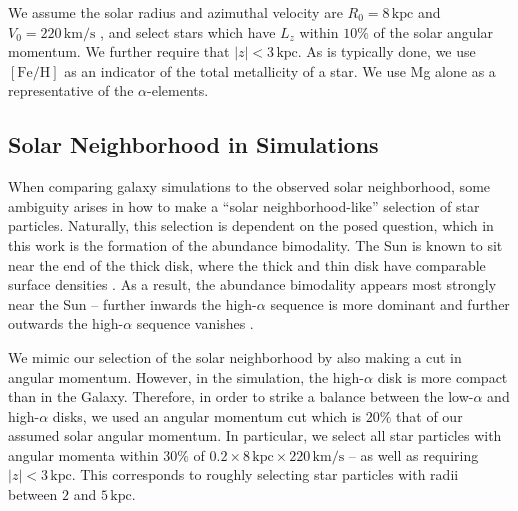 \documentclass[twocolumn,linenumbers,trackchanges]{aastex631}
\newcommand{\kpc}{\ensuremath{\textrm{kpc}}}
\newcommand{\kms}{\ensuremath{\textrm{km}/\textrm{s}}}
\newcommand{\FeH}{\ensuremath{[\textrm{Fe}/\textrm{H}]}}
\begin{document}
 We assume the solar radius and azimuthal velocity are $R_0=8\,\kpc$ and $V_0=220\,\kms$ \citep{2016ARA&A..54..529B}, and select stars which have $L_z$ within $10\%$ of the solar angular momentum. We further require that $\left|z\right| < 3\,\kpc$. As is typically done, we use \FeH{} as an indicator of the total metallicity of a star. We use Mg alone as a representative of the $\alpha$-elements.


\subsection{Solar Neighborhood in Simulations}\label{ssec:solarneigh}
When comparing galaxy simulations to the observed solar neighborhood, some ambiguity arises in how to make a ``solar neighborhood-like'' selection of star particles. Naturally, this selection is dependent on the posed question, which in this work is the formation of the abundance bimodality. The Sun is known to sit near the end of the thick disk, where the thick and thin disk have comparable surface densities \citep[the ratio of thick-to-thin is $\sim12\%$][]{2016ARA&A..54..529B}. As a result, the abundance bimodality appears most strongly near the Sun -- further inwards the high-$\alpha$ sequence is more dominant and further outwards the high-$\alpha$ sequence vanishes \citep[e.g.,][]{2015ApJ...808..132H}.

We mimic our selection of the solar neighborhood by also making a cut in angular momentum. However, in the simulation, the high-$\alpha$ disk is more compact than in the Galaxy. Therefore, in order to strike a balance between the low-$\alpha$ and high-$\alpha$ disks, we used an angular momentum cut which is $20\%$ that of our assumed solar angular momentum. In particular, we select all star particles with angular momenta within $30\%$ of $0.2\times8\,\kpc\times220\,\kms$ -- as well as requiring $\left| z \right| < 3\,\kpc$. This corresponds to roughly selecting star particles with radii between $2$ and $5\,\kpc$.
\end{document}
